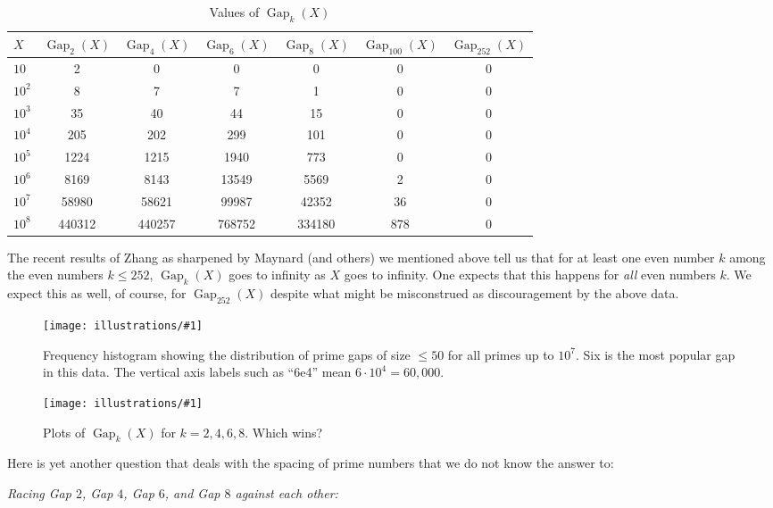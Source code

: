 \documentclass[openany]{book}
\DeclareMathOperator{\Gap}{Gap}
\newcommand{\ill}[3]{%
   \begin{figure}[H]%
   \vspace{-2ex}
   \centering%
   \texttt{[image: illustrations/\#1]}%
   \caption{#3}%
   \vspace{-2ex}
    \end{figure}}
\theoremstyle{plain}
\theoremstyle{definition}
\begin{document}
\begin{table}[H]\centering
\caption{Values of $\Gap_{k}(X)$ \label{tab:gap}}
\vspace{1em}

{\small
\begin{tabular}{|l|c|c|c|c|c|c|}\hline
$X$ & $\Gap_{2}(X)$ & $\Gap_{4}(X)$& $\Gap_{6}(X)$ & $\Gap_{8}(X)$ &
 $\Gap_{100}(X)$ &   $\Gap_{252}(X)$\\\hline

$10$ & 2 & 0 & 0 & 0 & 0 & 0\\\hline
$10^{2}$ & 8 & 7 & 7 & 1 & 0 & 0\\\hline
$10^{3}$ & 35 & 40 & 44 & 15 & 0 & 0\\\hline
$10^{4}$ & 205 & 202 & 299 & 101 & 0 & 0\\\hline
$10^{5}$ & 1224 & 1215 & 1940 & 773 & 0 & 0\\\hline
$10^{6}$ & 8169 & 8143 & 13549 & 5569 & 2 & 0\\\hline
$10^{7}$ & 58980 & 58621 & 99987 & 42352 & 36 & 0\\\hline
$10^{8}$ & 440312 & 440257 & 768752 & 334180 & 878 & 0\\\hline

\end{tabular}
}
\end{table}

 The recent results of Zhang as sharpened by Maynard (and others) we mentioned above tell us that for  at least one even number $k$ among the  even numbers $k \le 252$,    $\Gap_{k}(X)$ goes to infinity as $X$ goes to infinity. One expects that this happens for {\it all} even numbers $k$. We expect this as well, of course, for $\Gap_{252}(X)$ despite what might be misconstrued as discouragement by the above data.

\ill{primegapdist}{1}{Frequency histogram showing the distribution of
  prime gaps of size $\leq 50$ for all primes up to $10^7$.  Six is
  the most popular gap in this data.  The vertical axis labels
  such as ``6e4'' mean $6\cdot 10^4=60{,}000$.
\label{fig:primegapdist}}


\ill{primegap_race}{1}{Plots of $\Gap_k(X)$ for $k=2,4,6,8$.  Which wins?}

Here is yet another question that deals with the spacing of prime
numbers that we do not know the answer to:

{\em Racing Gap $2$,  Gap $4$, Gap $6$, and Gap $8$ against each other:}
\end{document}
